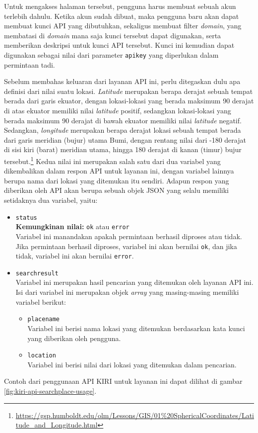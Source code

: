 Untuk mengakses halaman tersebut, pengguna harus membuat sebuah akun terlebih dahulu. Ketika akun sudah dibuat, maka pengguna baru akan dapat membuat kunci API yang dibutuhkan, sekaligus membuat filter \textit{domain}, yang membatasi di \textit{domain} mana saja kunci tersebut dapat digunakan, serta memberikan deskripsi untuk kunci API tersebut. Kunci ini kemudian dapat digunakan sebagai nilai dari parameter \verb|apikey| yang diperlukan dalam permintaan tadi.

Sebelum membahas keluaran dari layanan API ini, perlu ditegaskan dulu apa definisi dari nilai \latlon suatu lokasi. \textit{Latitude} merupakan berapa derajat sebuah tempat berada dari garis ekuator, dengan lokasi-lokasi yang berada maksimum 90 derajat di atas ekuator memiliki nilai \textit{latitude} positif, sedangkan lokasi-lokasi yang berada maksimum 90 derajat di bawah ekuator memiliki nilai \textit{latitude} negatif. Sedangkan, \textit{longitude} merupakan berapa derajat lokasi sebuah tempat berada dari garis meridian (bujur) utama Bumi, dengan rentang nilai dari -180 derajat di sisi kiri (barat) meridian utama, hingga 180 derajat di kanan (timur) bujur tersebut.\footnote{\href{https://gsp.humboldt.edu/olm/Lessons/GIS/01\%20SphericalCoordinates/Latitude\_and\_Longitude.html}{https://gsp.humboldt.edu/olm/Lessons/GIS/01\%20SphericalCoordinates/Latitude\_and\_Longitude.html}} Kedua nilai ini merupakan salah satu dari dua variabel yang dikembalikan dalam respon API untuk layanan ini, dengan variabel lainnya berupa nama dari lokasi yang ditemukan itu sendiri. Adapun respon yang diberikan oleh API akan berupa sebuah objek JSON yang selalu memiliki setidaknya dua variabel, yaitu:

\begin{itemize}
	\item \verb|status|\\
	\textbf{Kemungkinan nilai:} \verb|ok| atau \verb|error|\\
	Variabel ini manandakan apakah permintaan berhasil diproses atau tidak. Jika permintaan berhasil diproses, variabel ini akan bernilai \verb|ok|, dan jika tidak, variabel ini akan bernilai \verb|error|.
	\item \verb|searchresult|\\
	Variabel ini merupakan hasil pencarian yang ditemukan oleh layanan API ini. Isi dari variabel ini merupakan objek \textit{array} yang masing-masing memiliki variabel berikut:
	
	\begin{itemize}
		\item \verb|placename|\\
		Variabel ini berisi nama lokasi yang ditemukan berdasarkan kata kunci yang diberikan oleh pengguna.
		\item \verb|location|\\
		Variabel ini berisi nilai \latlon dari lokasi yang ditemukan dalam pencarian.
	\end{itemize}
	
\end{itemize}
\vspace{\baselineskip}\noindent
Contoh dari penggunaan API KIRI untuk layanan ini dapat dilihat di gambar \ref{fig:kiri-api-searchplace-usage}.

